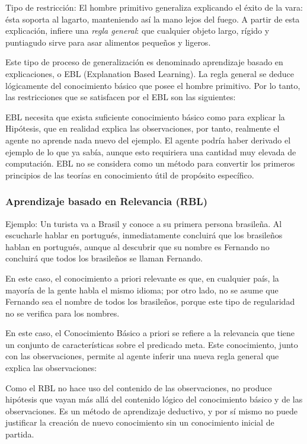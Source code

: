 \documentclass[12 pt, a4paper]{article}
\begin{document}
			Tipo de restricción: El hombre primitivo generaliza explicando el éxito de la vara: ésta soporta al lagarto, manteniendo así la mano lejos del fuego. A partir de esta explicación, infiere una \emph{regla general}: que cualquier objeto largo, rígido y puntiagudo sirve para asar alimentos pequeños y ligeros.
			
			Este tipo de proceso de generalización es denominado aprendizaje basado en explicaciones, o EBL (Explanation Based Learning). La regla general se deduce lógicamente del conocimiento básico que posee el hombre primitivo. Por lo tanto, las restricciones que se satisfacen por el EBL son las siguientes:
			
			EBL necesita que exista suficiente conocimiento básico como para explicar la Hipótesis, que en realidad explica las observaciones, por tanto, realmente el agente no aprende nada nuevo del ejemplo. El agente podría haber derivado el ejemplo de lo que ya sabía, aunque esto requiriera una cantidad muy elevada de computación. EBL no se considera como un método para convertir los primeros principios de las teorías en conocimiento útil de propósito específico.
			\subsubsection{Aprendizaje basado en Relevancia (RBL)}
			Ejemplo: Un turista va a Brasil y conoce a su primera persona brasileña. Al escucharle hablar en portugués, inmediatamente concluirá que los brasileños hablan en portugués, aunque al descubrir que su nombre es Fernando no concluirá que todos los brasileños se llaman Fernando.
			
			En este caso, el conocimiento a priori relevante es que, en cualquier país, la mayoría de la gente habla el mismo idioma; por otro lado, no se asume que Fernando sea el nombre de todos los brasileños, porque este tipo de regularidad no se verifica para los nombres.

			En este caso, el Conocimiento Básico a priori se refiere a la relevancia que tiene un conjunto de características sobre el predicado meta. Este conocimiento, junto con las observaciones, permite al agente inferir una nueva regla general que explica las observaciones:
			
			Como el RBL no hace uso del contenido de las observaciones, no produce hipótesis que vayan más allá del contenido lógico del conocimiento básico y de las observaciones. Es un método de aprendizaje deductivo, y por sí mismo no puede justificar la creación de nuevo conocimiento sin un conocimiento inicial de partida.
			
\end{document}
